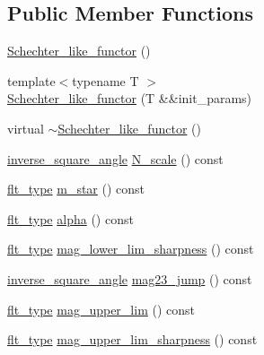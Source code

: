 \subsection*{Public Member Functions}
\begin{DoxyCompactItemize}
\item 
\hyperlink{classIceBRG_1_1Schechter__like__functor_a98942cf327953bc6de8cdd53fde65ef7}{Schechter\-\_\-like\-\_\-functor} ()
\item 
{\footnotesize template$<$typename T $>$ }\\\hyperlink{classIceBRG_1_1Schechter__like__functor_a351e38eaf242da441ca220369def0bc6}{Schechter\-\_\-like\-\_\-functor} (T \&\&init\-\_\-params)
\item 
virtual \hyperlink{classIceBRG_1_1Schechter__like__functor_aaf1a25297a4e050deab517c7e1edebfb}{$\sim$\-Schechter\-\_\-like\-\_\-functor} ()
\item 
\hyperlink{namespaceIceBRG_a26efaff9c9adf346c7d09d0b714731f6}{inverse\-\_\-square\-\_\-angle} \hyperlink{classIceBRG_1_1Schechter__like__functor_a1c867a8a96d360d3b1da7c122f9f96a3}{N\-\_\-scale} () const 
\item 
\hyperlink{lib_2IceBRG__main_2common_8h_ad0f130a56eeb944d9ef2692ee881ecc4}{flt\-\_\-type} \hyperlink{classIceBRG_1_1Schechter__like__functor_a80a81ec7dcad32167672eec726bbca00}{m\-\_\-star} () const 
\item 
\hyperlink{lib_2IceBRG__main_2common_8h_ad0f130a56eeb944d9ef2692ee881ecc4}{flt\-\_\-type} \hyperlink{classIceBRG_1_1Schechter__like__functor_afb0660168ea5cc0462369c0559a4654c}{alpha} () const 
\item 
\hyperlink{lib_2IceBRG__main_2common_8h_ad0f130a56eeb944d9ef2692ee881ecc4}{flt\-\_\-type} \hyperlink{classIceBRG_1_1Schechter__like__functor_a36c03d8a6b0bacc3f6fbc60cf828ca7a}{mag\-\_\-lower\-\_\-lim\-\_\-sharpness} () const 
\item 
\hyperlink{namespaceIceBRG_a26efaff9c9adf346c7d09d0b714731f6}{inverse\-\_\-square\-\_\-angle} \hyperlink{classIceBRG_1_1Schechter__like__functor_a5ec784331b2eeb1a1d6077e6cc691e82}{mag23\-\_\-jump} () const 
\item 
\hyperlink{lib_2IceBRG__main_2common_8h_ad0f130a56eeb944d9ef2692ee881ecc4}{flt\-\_\-type} \hyperlink{classIceBRG_1_1Schechter__like__functor_ad51153efefe230a196400a72f6b98510}{mag\-\_\-upper\-\_\-lim} () const 
\item 
\hyperlink{lib_2IceBRG__main_2common_8h_ad0f130a56eeb944d9ef2692ee881ecc4}{flt\-\_\-type} \hyperlink{classIceBRG_1_1Schechter__like__functor_a977c88ecf83ce6116b33698d80d7b99a}{mag\-\_\-upper\-\_\-lim\-\_\-sharpness} () const 

\end{DoxyCompactItemize}
